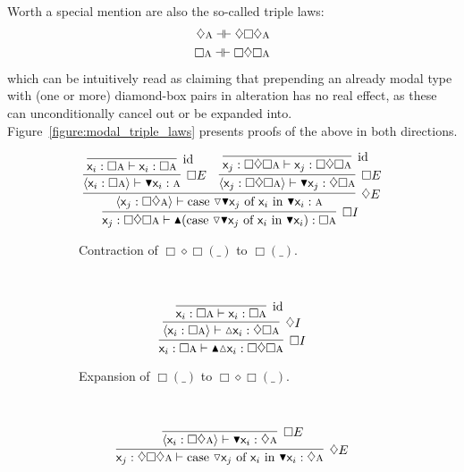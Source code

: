 Worth a special mention are also the so-called triple laws:
\begin{align}
	\diamond\prop{a} \dashv\vdash \diamond\Box\diamond\prop{a}\\
	\Box\prop{a} \dashv\vdash \Box\diamond\Box\prop{a}
\end{align}
which can be intuitively read as claiming that prepending an already modal type with (one or more) diamond-box pairs in alteration has no real effect, as these can unconditionally cancel out or be expanded into.
Figure~\ref{figure:modal_triple_laws} presents proofs of the above in both directions.


\begin{figure}
	\centering
	\begin{subfigure}{1\textwidth}
		\[
			\infer[\Box I]{\term{\varj}: \Box\diamond\Box\prop{a} \vdash \boxintro(\caseof{\diaelim \boxelim \varj}{\vari }{\boxelim{\vari }}): \Box\prop{a}}{
				\infer[\diamond E]{\bracket{\term{\varj}: \Box\diamond \prop{a}} \vdash \caseof{\diaelim \boxelim \varj}{\vari }{\boxelim{\vari }}: \prop{a}}{
					\infer[\Box E]{\bracket{\term{\vari }: \Box \prop{a}} \vdash \term{\boxelim \vari }:\prop{a}}{
						\infer[\Ax]{\term{\vari }: \Box\prop{a} \vdash \term{\vari }: \Box\prop{a}}{}
					}
					&
					\infer[\Box E]{\bracket{\term{\varj}:\Box\diamond\Box\prop{a}} \vdash \term{\boxelim \varj}:\diamond\Box\prop{a}}{
						\infer[\Ax]{\term{\varj}: \Box\diamond\Box\prop{a}\vdash\term{\varj}:\Box\diamond\Box\prop{a}}{}
					}
				}
			}
		\]
		\caption{Contraction of $\Box\diamond\Box(\_)$ to $\Box(\_)$.}
		\label{subfigure:triple_law:box_collapse}
	\end{subfigure}\\[\midsep]
	\begin{subfigure}{1\textwidth}
		\[
			\infer[\Box I]{\term{\vari }:\Box\prop{a} \vdash \boxintro\diaintro\term{\vari }:\Box\diamond\Box\prop{a}}{
				\infer[\diamond I]{\bracket{\term{\vari }: \Box\prop{a}} \vdash \diaintro\term{\vari }:\diamond\Box\prop{a}}{
					\infer[\Ax]{\term{\vari }:\Box\prop{a}\vdash \term{\vari }:\Box\prop{a}}{}
				}
			}
		\]
		\caption{Expansion of $\Box(\_)$ to $\Box\diamond\Box(\_)$.}
		\label{subfigure:triple_law:box_expand}
	\end{subfigure}\\[\midsep]
	\begin{subfigure}{1\textwidth}
		\[
			\infer[\diamond E]{\term{\varj}:\diamond\Box\diamond\prop{a} \vdash \caseof{\diaelim \varj}{\vari }{\boxelim \vari }: \diamond\prop{a}}{
				\infer[\Box E]{\bracket{\term{\vari }: \Box\diamond\prop{a}} \vdash \boxelim\term{\vari }: \diamond\prop{a}}{
}}\]
\end{subfigure}
\end{figure}
